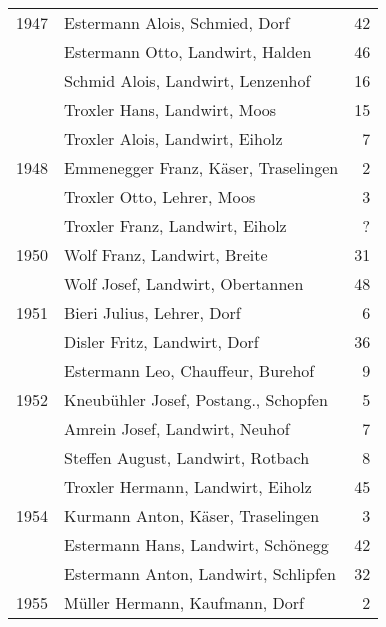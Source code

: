 {\begin{longtable}{ l l r }
        \\
        1947          & Estermann Alois, Schmied, Dorf            & 42          \\
                      & Estermann Otto, Landwirt, Halden          & 46          \\
                      & Schmid Alois, Landwirt, Lenzenhof         & 16          \\
                      & Troxler Hans, Landwirt, Moos              & 15          \\
                      & Troxler Alois, Landwirt, Eiholz           & 7           \\
        1948          & Emmenegger Franz, Käser, Traselingen      & 2           \\
                      & Troxler Otto, Lehrer, Moos                & 3           \\
                      & Troxler Franz, Landwirt, Eiholz           & ?           \\
        1950          & Wolf Franz, Landwirt, Breite              & 31          \\
                      & Wolf Josef, Landwirt, Obertannen          & 48          \\
        1951          & Bieri Julius, Lehrer, Dorf                & 6           \\
                      & Disler Fritz, Landwirt, Dorf              & 36          \\
                      & Estermann Leo, Chauffeur, Burehof         & 9           \\
        1952          & Kneubühler Josef, Postang., Schopfen      & 5           \\
                      & Amrein Josef, Landwirt, Neuhof            & 7           \\
                      & Steffen August, Landwirt, Rotbach         & 8           \\
                      & Troxler Hermann, Landwirt, Eiholz         & 45          \\
        1954          & Kurmann Anton, Käser, Traselingen         & 3           \\
                      & Estermann Hans, Landwirt, Schönegg        & 42          \\
                      & Estermann Anton, Landwirt, Schlipfen      & 32          \\
        1955          & Müller Hermann, Kaufmann, Dorf            & 2           \\

\end{longtable}}
